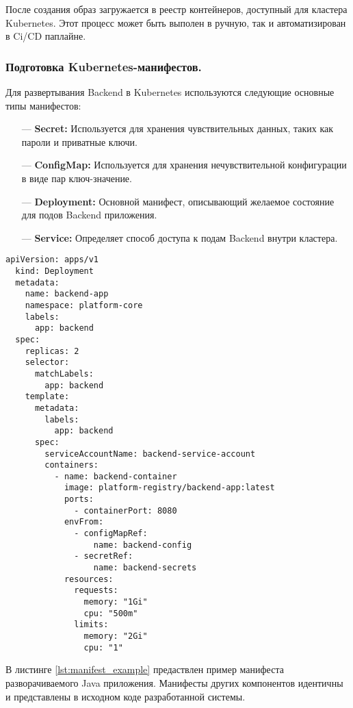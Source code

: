 После создания образ загружается в реестр контейнеров, доступный для кластера Kubernetes. Этот процесс может быть выполен в ручную, так и автоматизирован в Ci/CD паплайне.

\subsubsection{Подготовка Kubernetes-манифестов.}

Для развертывания Backend в Kubernetes используются следующие основные типы манифестов:

\begin{itemize}
    \item[---]\textbf{Secret:} Используется для хранения чувствительных данных, таких как пароли и приватные ключи.
    \item[---]\textbf{ConfigMap:} Используется для хранения нечувствительной конфигурации в виде пар ключ-значение. 
    \item[---]\textbf{Deployment:} Основной манифест, описывающий желаемое состояние для подов Backend приложения.
    \item[---]\textbf{Service:} Определяет способ доступа к подам Backend внутри кластера.
\end{itemize}

\begin{lstlisting}[caption={Манифест Deployment компонета}, label=lst:manifest_example]
  apiVersion: apps/v1
  kind: Deployment
  metadata:
    name: backend-app          
    namespace: platform-core   
    labels:
      app: backend             
  spec:
    replicas: 2                
    selector:
      matchLabels:
        app: backend           
    template:
      metadata:
        labels:
          app: backend         
      spec:
        serviceAccountName: backend-service-account 
        containers:
          - name: backend-container 
            image: platform-registry/backend-app:latest 
            ports:
              - containerPort: 8080 
            envFrom:
              - configMapRef:
                  name: backend-config 
              - secretRef:
                  name: backend-secrets 
            resources:
              requests: 
                memory: "1Gi"
                cpu: "500m" 
              limits:   
                memory: "2Gi"
                cpu: "1"    
\end{lstlisting}

В листинге \ref{lst:manifest_example} предаствлен пример манифеста разворачиваемого Java приложения. Манифесты других компонентов идентичны и представлены в исходном коде разработанной системы.

